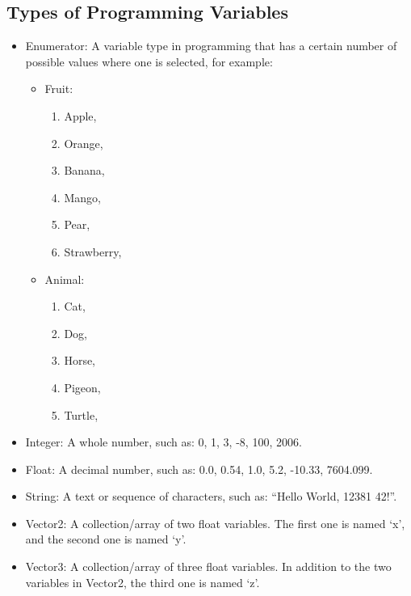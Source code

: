 \documentclass[a4paper, 12pt]{article}
\begin{document}
\subsection{Types of Programming Variables}
\begin{itemize}
    \item{Enumerator: A variable type in programming that has a certain number of possible values where one is selected, for example:
    
    \begin{itemize}
    \item{Fruit:}
    	\begin{enumerate}
    	\item{Apple,}
    	\item{Orange,}
    	\item{Banana,}
    	\item{Mango,}
    	\item{Pear,}
    	\item{Strawberry,}
    	\end{enumerate}
    \item{Animal:}
        \begin{enumerate}
    	\item{Cat,}
    	\item{Dog,}
    	\item{Horse,}
    	\item{Pigeon,}
    	\item{Turtle,}
    	\end{enumerate}
    \end{itemize} 
    }   
    \item{Integer: A whole number, such as: 0, 1, 3, -8, 100, 2006.}
    
    \item{Float: A decimal number, such as: 0.0, 0.54, 1.0, 5.2, -10.33, 7604.099.}
    
    \item{String: A text or sequence of characters, such as: “Hello World, 12381 42!”.}
    
    \item{Vector2\normalfont: A collection/array of two float variables. The first one is named ‘x’, and the second one is named ‘y’.}
    
    \item{Vector3\normalfont: A collection/array of three float variables. In addition to the two variables in Vector2\normalfont, the third one is named ‘z’.}
    

\end{itemize}
\end{document}
